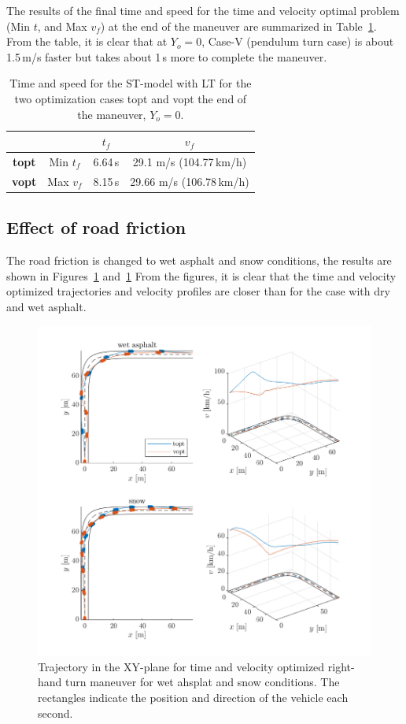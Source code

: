 The results of the final time and speed for the time and velocity optimal problem (Min $t$, and Max $v_f$) at the end of the maneuver are summarized in Table~\ref{tab:opt_res_num_pep2_TV}. 
From the table, it is clear that at $Y_o = 0$, Case-V (pendulum turn case) is about 1.5\,m/s faster but takes about 1\,s more to complete the maneuver. 
\begin{table}[h!]
    \centering
    \begin{tabular}{c|c|c|c}
        & & $t_f$ & $v_f$\\
        \hline
        \textbf{topt} & Min $t_f$ & 6.64\,s & 29.1 m/s (104.77\,km/h)\\
        \textbf{vopt} & Max $v_f$ & 8.15\,s & 29.66 m/s (106.78\,km/h)\\
    \end{tabular}
    \caption{Time and speed for the ST-model with LT for the two optimization cases topt and vopt the end of the maneuver, $Y_o = 0$.}
    \label{tab:opt_res_num_pep2_TV}
\end{table}

\clearpage
\subsection{Effect of road friction}
The road friction is changed to wet asphalt and snow conditions, the results are shown in Figures~\ref{fig:pep2_FricComp_posplot} and~\ref{fig:pep2_FricComp_posplot} From the figures, it is clear that the time and velocity optimized trajectories and velocity profiles are closer than for the case with dry and wet asphalt. 

\begin{figure}[h!]
    \centering
    \includegraphics{figures/pep2_FricComp_posplot.pdf}
    \caption{Trajectory in the XY-plane for time and velocity optimized right-hand turn maneuver for wet ahsplat and snow conditions. The rectangles indicate the position and direction of the vehicle each second.}
    \label{fig:pep2_FricComp_posplot}
\end{figure}

